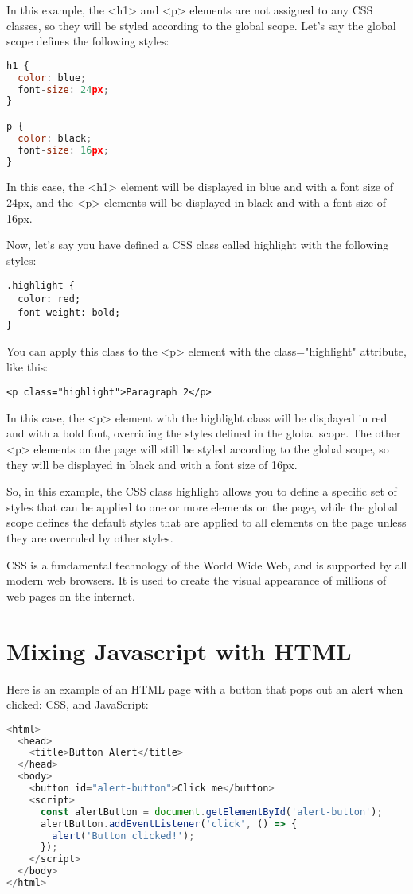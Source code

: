 {In this example, the <h1> and <p> elements are not assigned to any CSS classes, so they will be styled according to the global scope. Let's say the global scope defines the following styles:
\begin{lstlisting}[language=Javascript, nolol]
h1 {
  color: blue;
  font-size: 24px;
}

p {
  color: black;
  font-size: 16px;
}

\end{lstlisting}

In this case, the <h1> element will be displayed in blue and with a font size of 24px, and the <p> elements will be displayed in black and with a font size of 16px.

Now, let's say you have defined a CSS class called highlight with the following styles:

\begin{lstlisting}
.highlight {
  color: red;
  font-weight: bold;
}
\end{lstlisting}

You can apply this class to the <p> element with the class="highlight" attribute, like this:

\begin{lstlisting}
<p class="highlight">Paragraph 2</p>
\end{lstlisting}

In this case, the <p> element with the highlight class will be displayed in red and with a bold font, overriding the styles defined in the global scope. The other <p> elements on the page will still be styled according to the global scope, so they will be displayed in black and with a font size of 16px.

So, in this example, the CSS class highlight allows you to define a specific set of styles that can be applied to one or more elements on the page, while the global scope defines the default styles that are applied to all elements on the page unless they are overruled by other styles.

CSS is a fundamental technology of the World Wide Web, and is supported by all modern web browsers. It is used to create the visual appearance of millions of web pages on the internet.


\section{Mixing Javascript with HTML}



Here is an example of an HTML page with a button that pops out an alert when clicked: CSS, and JavaScript:
\begin{lstlisting}[language=Javascript, caption=Alert with HTML]
<html>
  <head>
    <title>Button Alert</title>
  </head>
  <body>
    <button id="alert-button">Click me</button>
    <script>
      const alertButton = document.getElementById('alert-button');
      alertButton.addEventListener('click', () => {
        alert('Button clicked!');
      });
    </script>
  </body>
</html>


\end{lstlisting}}
